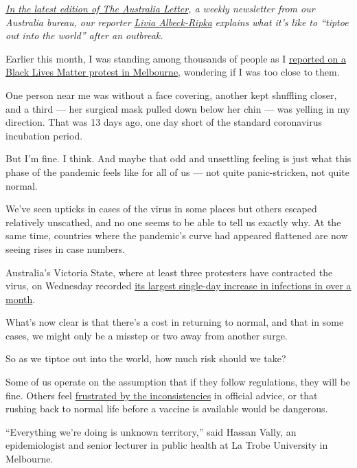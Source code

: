 \href{https://www.nytimes.com/2020/06/19/world/australia/coronavirus-new-normal.html}{\emph{In
the latest edition of The Australia Letter}}\emph{, a weekly newsletter
from our Australia bureau, our reporter}
\href{https://www.nytimes.com/by/livia-albeck-ripka}{\emph{Livia
Albeck-Ripka}} \emph{explains what it's like to ``tiptoe out into the
world'' after an outbreak.}

Earlier this month, I was standing among thousands of people as I
\href{https://www.nytimes.com/2020/06/06/world/george-floyd-global-protests.html}{reported
on a Black Lives Matter protest in Melbourne}, wondering if I was too
close to them.

One person near me was without a face covering, another kept shuffling
closer, and a third --- her surgical mask pulled down below her chin ---
was yelling in my direction. That was 13 days ago, one day short of the
standard coronavirus incubation period.

But I'm fine. I think. And maybe that odd and unsettling feeling is just
what this phase of the pandemic feels like for all of us --- not quite
panic-stricken, not quite normal.

We've seen upticks in cases of the virus in some places but others
escaped relatively unscathed, and no one seems to be able to tell us
exactly why. At the same time, countries where the pandemic's curve had
appeared flattened are now seeing rises in case numbers.

Australia's Victoria State, where at least three protesters have
contracted the virus, on Wednesday recorded
\href{https://www.abc.net.au/news/2020-06-17/coronavirus-cases-in-victoria-rise-by-21/12362782}{its
largest single-day increase in infections in over a month}.

What's now clear is that there's a cost in returning to normal, and that
in some cases, we might only be a misstep or two away from another
surge.

So as we tiptoe out into the world, how much risk should we take?

Some of us operate on the assumption that if they follow regulations,
they will be fine. Others feel
\href{https://www.crikey.com.au/2020/06/12/scott-morrisons-double-standards-on-protests-make-it-clear-whose-lives-matters-most/}{frustrated
by the inconsistencies} in official advice, or that rushing back to
normal life before a vaccine is available would be dangerous.

``Everything we're doing is unknown territory,'' said Hassan Vally, an
epidemiologist and senior lecturer in public health at La Trobe
University in Melbourne.

